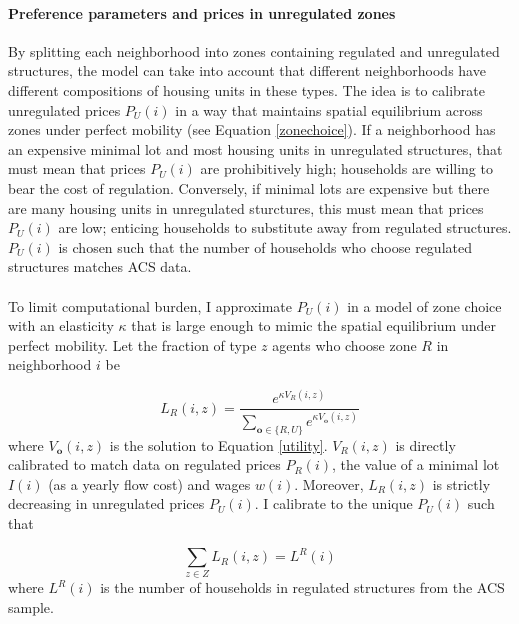 \documentclass[11pt]{article}
\begin{document}
\paragraph*{Preference parameters and prices in unregulated zones} By splitting each neighborhood into zones containing regulated and unregulated structures, the model can take into account that different neighborhoods have different compositions of housing units in these types. The idea is to calibrate unregulated prices $P_{U}(i)$ in a way that maintains spatial equilibrium across zones under perfect mobility (see Equation \ref{zonechoice}). If a neighborhood has an expensive minimal lot and most housing units in unregulated structures, that must mean that prices $P_{U}(i)$ are prohibitively high; households are willing to bear the cost of regulation. Conversely, if minimal lots are expensive but there are many housing units in unregulated sturctures, this must mean that prices $P_{U}(i)$ are low; enticing households to substitute away from regulated structures. $P_{U}(i)$ is chosen such that the number of households who choose regulated structures matches ACS data. 

\paragraph*{}
To limit computational burden, I approximate $P_{U}(i)$ in a model of zone choice with an elasticity $\kappa$ that is large enough to mimic the spatial equilibrium under perfect mobility. Let the fraction of type $z$ agents who choose zone $R$ in neighborhood $i$ be 

\begin{equation}\label{CalibrateUnregulated}
	L_{R}(i, z) = \frac{e^{\kappa V_{R}(i, z)}}{\sum_{\boldsymbol{o} \in \{R, U\}}e^{\kappa V_{\boldsymbol{o}}(i, z)}}
\end{equation}
where $V_{\boldsymbol{o}}(i, z)$ is the solution to Equation \eqref{utility}. $V_{R}(i, z)$ is directly calibrated to match data on regulated prices $P_{R}(i)$, the value of a minimal lot $I(i)$ (as a yearly flow cost) and wages $w(i)$. Moreover, $L_{R}(i, z)$ is strictly decreasing in unregulated prices $P_{U}(i)$. I calibrate to the unique $P_{U}(i)$ such that 

\begin{equation*}
	\sum_{z \in Z}L_{R}(i, z) = L^{R}(i)
\end{equation*}
where $L^{R}(i)$ is the number of households in regulated structures from the ACS sample.
\end{document}
